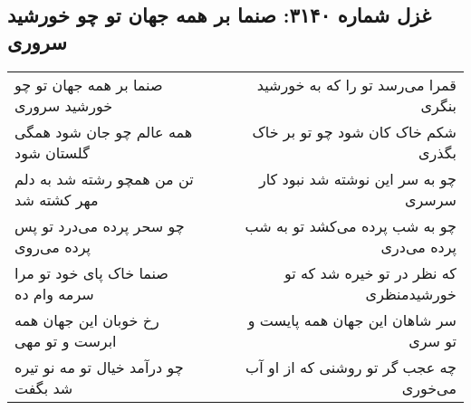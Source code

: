 \begin{center}
\section*{غزل شماره ۳۱۴۰: صنما بر همه جهان تو چو خورشید سروری}
\label{sec:3140}
\begin{longtable}{l p{0.5cm} r}
صنما بر همه جهان تو چو خورشید سروری
&&
قمرا می‌رسد تو را که به خورشید بنگری
\\
همه عالم چو جان شود همگی گلستان شود
&&
شکم خاک کان شود چو تو بر خاک بگذری
\\
تن من همچو رشته شد به دلم مهر کشته شد
&&
چو به سر این نوشته شد نبود کار سرسری
\\
چو سحر پرده می‌درد تو پس پرده می‌روی
&&
چو به شب پرده می‌کشد تو به شب پرده می‌دری
\\
صنما خاک پای خود تو مرا سرمه وام ده
&&
که نظر در تو خیره شد که تو خورشیدمنظری
\\
رخ خوبان این جهان همه ابرست و تو مهی
&&
سر شاهان این جهان همه پایست و تو سری
\\
چو درآمد خیال تو مه نو تیره شد بگفت
&&
چه عجب گر تو روشنی که از او آب می‌خوری
\\
\end{longtable}
\end{center}
